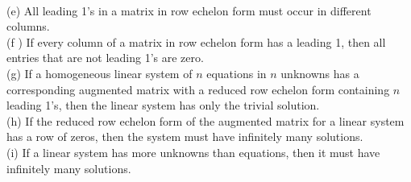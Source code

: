 \\
(e) All leading 1's in a matrix in row echelon form must occur in different columns.
\\
(f ) If every column of a matrix in row echelon form has a leading 1, then all entries that are not leading 1's are zero.
\\
(g) If a homogeneous linear system of $n$ equations in $n$ unknowns has a corresponding augmented matrix with a reduced row echelon form containing $n$ leading 1's, then the linear system has only the trivial solution.
\\
(h) If the reduced row echelon form of the augmented matrix for a linear system has a row of zeros, then the system must have infinitely many solutions.
\\
(i) If a linear system has more unknowns than equations, then it must have infinitely many solutions.
\ \\
